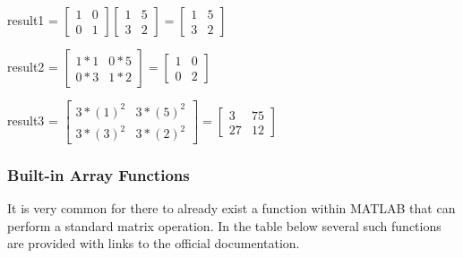 \documentclass[../MATLAB_Primer.tex]{subfiles}
\begin{document}
\begin{center}
    result1 = 
    $\begin{bmatrix}
     1 & 0\\
     0 & 1
    \end{bmatrix}
    \begin{bmatrix}
     1 & 5\\
     3 & 2
    \end{bmatrix} = 
    \begin{bmatrix}
     1 & 5\\
     3 & 2
    \end{bmatrix}$\\
\end{center}

\begin{center}
    result2 = 
    $\begin{bmatrix}
     1*1 & 0*5\\
     0*3 & 1*2
    \end{bmatrix} = 
    \begin{bmatrix}
     1 & 0\\
     0 & 2
    \end{bmatrix}$
\end{center}

\begin{center}
    result3 =
    $\begin{bmatrix}
     3*(1)^{2} & 3*(5)^{2}\\
     3*(3)^{2} & 3*(2)^{2}
    \end{bmatrix} = 
    \begin{bmatrix}
     3 & 75\\
     27 & 12
    \end{bmatrix}$
\end{center}

\subsubsection{Built-in Array Functions}
It is very common for there to already exist a function within MATLAB that can perform a standard matrix operation. In the table below several such functions are provided with links to the official documentation. 
\end{document}
